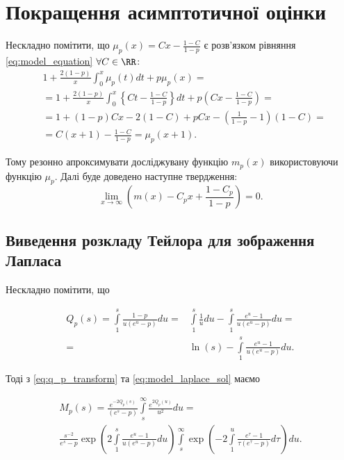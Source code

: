 \section{Покращення асимптотичної оцінки}

Нескладно помітити, що $\mu_{p}(x) = C x - \frac{1-C}{1 - p}$ є розв'язком рівняння \eqref{eq:model_equation} $\forall C \in \RR$:
\begin{align*}
&1 + \frac{2 (1-p)}{x} \int_{0}^{x} \mu_{p}(t) dt + p\mu_{p}(x) = \\
&=1 + \frac{2 (1-p)}{x} \int_{0}^{x} \left\{C t - \frac{1 - C}{1 - p} \right\} dt + p \left( C x - \frac{1 - C}{1 - p}\right) = \\
&=1 + (1 - p) C x - 2(1 - C) + p C x - (\frac{1}{1 - p} - 1)(1 - C) = \\
&= C(x + 1) - \frac{1 - C}{1 - p} = \mu_{p}(x+1).
\end{align*}

Тому резонно апроксимувати досліджувану функцію $m_{p}(x)$ використовуючи функцію $\mu_{p}$. Далі буде доведено наступне твердження:
\begin{equation}
\label{eq:fine_asymptotics_1}
\lim\limits_{x \rightarrow \infty} \left( m(x) - C_{p} x + \frac{1 - C_{p}}{1 - p} \right) = 0.
\end{equation}

\subsection{Виведення розкладу Тейлора для зображення Лапласа}

Нескладно помітити, що

\begin{equation}
\label{eq:q_p_transform}
\begin{split}
Q_{p}(s) = \int\limits_{1}^{s} \frac{1-p}{u(e^u - p)} du =& \int\limits_{1}^{s} \frac{1}{u} du - \int\limits_{1}^{s} \frac{e^u -1}{u(e^u - p)} du = \\
=& \ln(s) - \int\limits_{1}^{s} \frac{e^u -1}{u(e^u - p)} du.
\end{split}
\end{equation}

Тоді з \eqref{eq:q_p_transform} та \eqref{eq:model_laplace_sol} маємо

\begin{gather*}
M_{p}(s) =\frac{e^{-2Q_p(s)}}{(e^s - p)} \int\limits_s^\infty \frac{e^{2Q_p(u)}}{u^2} du = \\
\frac{s^{-2}}{e^s-p} \exp \left(2 \int\limits_{1}^{s} \frac{e^u -1}{u(e^u - p)} du\right) \int\limits_s^\infty \exp\left(-2 \int\limits_{1}^{u} \frac{e^\tau -1}{\tau(e^\tau - p)} d\tau\right) du.
\end{gather*}

